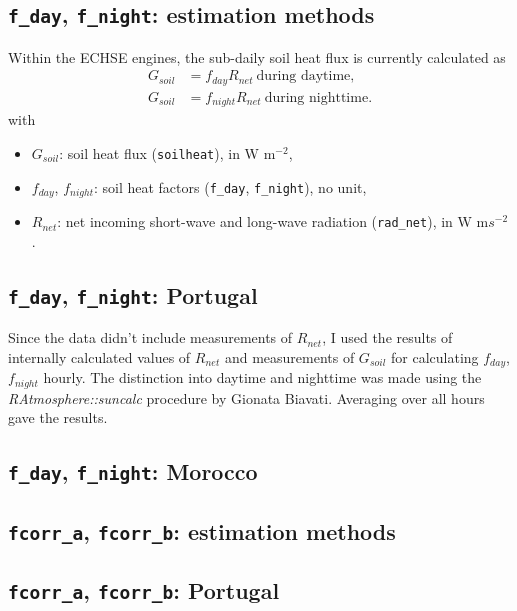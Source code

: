 \documentclass{scrreprt}
\begin{document}
\subsection{\texttt{f\_day}, \texttt{f\_night}: estimation methods} \label{ssec:parest_rad_fmethods}

Within the ECHSE engines, the sub-daily soil heat flux is currently calculated as
\begin{align}
  G_{soil} &= f_{day} R_{net} ~ \text{during daytime}, \label{eq:F1} \\
  G_{soil} &= f_{night} R_{net} ~ \text{during nighttime}. \label{eq:F2}
\end{align}
%
with
\begin{itemize}
  \item[] $G_{soil}$: soil heat flux (\verb!soilheat!), in W m$^{-2}$,
  \item[] $f_{day}$, $f_{night}$: soil heat factors (\verb!f_day!, \verb!f_night!), no unit,
  \item[] $R_{net}$: net incoming short-wave and long-wave radiation (\verb!rad_net!), in W m$s^{-2}$.
\end{itemize}

\subsection{\texttt{f\_day}, \texttt{f\_night}: Portugal} \label{ssec:parest_rad_fportugal}

Since the data didn't include measurements of $R_{net}$, I used the results of internally calculated values of $R_{net}$ and measurements of $G_{soil}$ for calculating $f_{day}$, $f_{night}$ hourly.
The distinction into daytime and nighttime was made using the \emph{RAtmosphere::suncalc} procedure by Gionata Biavati.
Averaging over all hours gave the results.

\subsection{\texttt{f\_day}, \texttt{f\_night}: Morocco} \label{ssec:parest_rad_fmorocco}

\subsection{\texttt{fcorr\_a}, \texttt{fcorr\_b}: estimation methods} \label{ssec:parest_rad_fcorrmethods}

\subsection{\texttt{fcorr\_a}, \texttt{fcorr\_b}: Portugal} \label{ssec:parest_rad_fcorrportugal}
\end{document}
